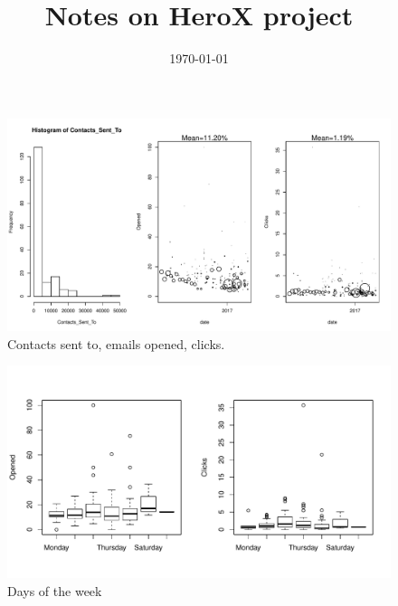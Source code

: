 \documentclass[12pt, titlepage]{article}
\institute{}
\title{Notes on HeroX project}
\date{\today}
\begin{document}
\maketitle


\clearpage

\begin{figure}
\centering
\includegraphics{report_notes_files/figure-latex/unnamed-chunk-2-1.pdf}
\caption{Contacts sent to, emails opened, clicks.}
\end{figure}

\newpage

\begin{figure}
\centering
\includegraphics{report_notes_files/figure-latex/unnamed-chunk-3-1.pdf}
\caption{Days of the week}
\end{figure}

\newpage
\end{document}
